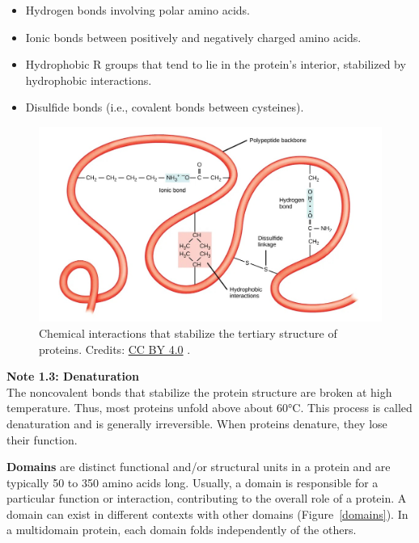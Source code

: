 \begin{itemize}
\item Hydrogen bonds involving polar amino acids.
\item Ionic bonds between positively and negatively charged amino acids.
\item Hydrophobic R groups that tend to lie in the protein's interior, stabilized by hydrophobic interactions.
\item Disulfide bonds (i.e., covalent bonds between cysteines).
\end{itemize}

\begin{figure}[!htbp]
\centering
\includegraphics[width=0.8\linewidth]{files/terstructure-4b7f78306caf16f9c7283bc23fe4a55b.jpg}
\caption[]{Chemical interactions that stabilize the tertiary structure of proteins.
Credits: \href{https://creativecommons.org/licenses/by/4.0}{CC BY 4.0} \cite{proteins_2018}.}
\label{terstructure}
\end{figure}

\begin{framed}
\textbf{Note 1.3: Denaturation}\\
The noncovalent bonds that stabilize the protein structure are broken at high temperature.
Thus, most proteins unfold above about 60°C.
This process is called denaturation and is generally irreversible.
When proteins denature, they lose their function.
\end{framed}

\textbf{Domains} are distinct functional and/or structural units in a protein and are typically 50 to 350 amino acids long.
Usually, a domain is responsible for a particular function or interaction, contributing to the overall role of a protein.
A domain can exist in different contexts with other domains (Figure~\ref{domains}).
In a multidomain protein, each domain folds independently of the others.

